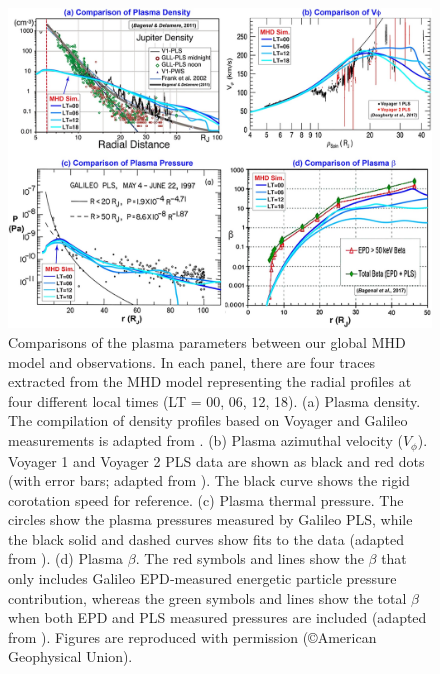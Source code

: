 \begin{figure}
    \centering
    \includegraphics[width=\textwidth]{images2/comparison-plasma.jpg}
    \caption{Comparisons of the plasma parameters between our global MHD model and observations. In each panel, there are four traces extracted from the MHD model representing the radial profiles at four different local times (LT = 00, 06, 12, 18). (a) Plasma density. The compilation of density profiles based on Voyager and Galileo measurements is adapted from \protect{}. (b) Plasma azimuthal velocity ($V_\phi$). Voyager 1 and Voyager 2 PLS data are shown as black and red dots (with error bars; adapted from \protect{}). The black curve shows the rigid corotation speed for reference. (c) Plasma thermal pressure. The circles show the plasma pressures measured by Galileo PLS, while the black solid and dashed curves show fits to the data (adapted from \protect{}). (d) Plasma $\beta$. The red symbols and lines show the $\beta$ that only includes Galileo EPD‐measured energetic particle pressure contribution, whereas the green symbols and lines show the total $\beta$ when both EPD and PLS measured pressures are included (adapted from \protect{}). Figures are reproduced with permission (\copyright American Geophysical Union).}
    \label{fig:comparison-plasma}
\end{figure}

